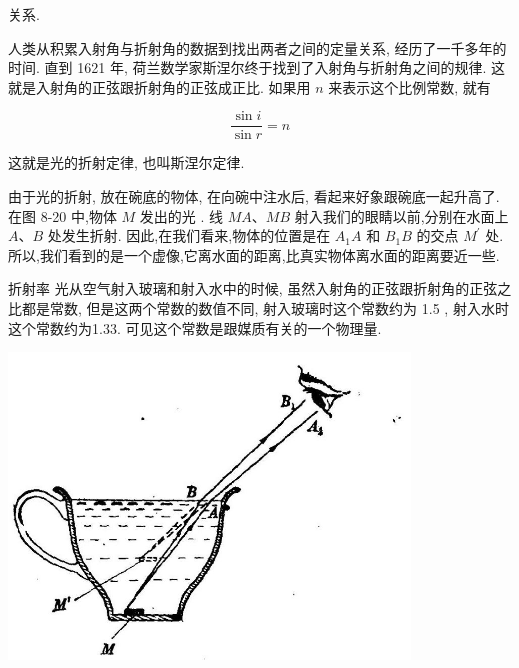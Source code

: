 \documentclass[10pt]{article}
\begin{document}
关系.

\begin{center}
\end{center}

人类从积累入射角与折射角的数据到找出两者之间的定量关系, 经历了一千多年的时间. 直到 1621 年, 荷兰数学家斯涅尔终于找到了入射角与折射角之间的规律. 这就是入射角的正弦跟折射角的正弦成正比. 如果用 \(n\) 来表示这个比例常数, 就有

\[
\frac{\sin i}{\sin r} = n
\]

这就是光的折射定律, 也叫斯涅尔定律.

由于光的折射, 放在碗底的物体, 在向碗中注水后, 看起来好象跟碗底一起升高了. 在图 8-20 中,物体 \(M\) 发出的光 . 线 \({MA}\text{、}{MB}\) 射入我们的眼睛以前,分别在水面上 \(A\text{、}B\) 处发生折射. 因此,在我们看来,物体的位置是在 \({A}_{1}A\) 和 \({B}_{1}B\) 的交点 \({M}^{\prime }\) 处. 所以,我们看到的是一个虚像,它离水面的距离,比真实物体离水面的距离要近一些.

折射率 光从空气射入玻璃和射入水中的时候, 虽然入射角的正弦跟折射角的正弦之比都是常数, 但是这两个常数的数值不同, 射入玻璃时这个常数约为 1.5 , 射入水时这个常数约为1.33. 可见这个常数是跟媒质有关的一个物理量.

\begin{center}
\includegraphics[max width=0.8\textwidth]{images/01913056-1f15-74d8-9184-9aab52c9d66b_259_608162.jpg}
\end{center}
\end{document}
